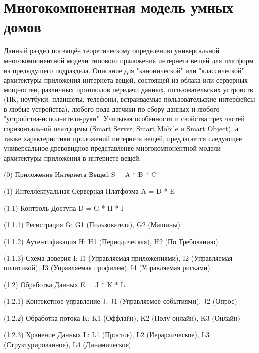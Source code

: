 \begin{textitemize}
\end{textitemize}


\section{Многокомпонентная модель умных домов}
\label{sec_multicomponent_SH_model}

Данный раздел посвящён теоретическому определению универсальной многокомпонентной модели типового приложения интернета вещей для платформ из предыдущего подраздела. Описание для "канонической"{} или "классической"{} архитектуры приложения интернета вещей, состоящей из облака или серверных мощностей, различных протоколов передачи данных, пользовательских устройств (ПК, ноутбуки, планшеты, телефоны, встраиваемые пользовательские интерфейсы в любые устройства), любого рода датчики по сбору данных и любого "устройства-исполнители-руки"{}. Учитывая особенности и свойства трех частей горизонтальной платформы (Smart Server, Smart Mobile и Smart Object), а также характеристики приложений интернета вещей, предлагается следующее универсальное древовидное представление многокомпонентной модели архитектуры приложения в интернете вещей.

(0) Приложение Интернета Вещей S = A * B * C

(1) Интеллектуальная Серверная Платформа A = D * E

(1.1) Контроль Доступа D = G * H * I

(1.1.1) Регистрация G: G1 (Пользователи), G2 (Машины)

(1.1.2) Аутентификация H: H1 (Периодическая), H2 (По Требованию)

(1.1.3) Схема доверия I: I1 (Управляемая приложениями), I2 (Управляемая политикой), I3 (Управляемая профилем), I4 (Управляемая рисками)

(1.2) Обработка Данных E = J * K * L

(1.2.1) Контекстное управление J: J1 (Управляемое событиями), J2 (Опрос)

(1.2.2) Обработка потока K: K1 (Оффлайн), K2 (Полу-онлайн), K3 (Онлайн)

(1.2.3) Хранение Данных L: L1 (Простое), L2 (Иерархическое), L3 (Структурированное), L4 (Динамическое)

